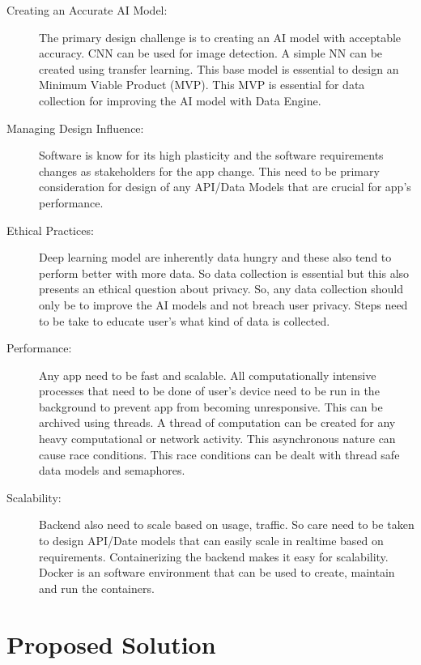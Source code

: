 \documentclass[../Report.tex]{subfiles}
\begin{document}
\begin{description}
    \item[Creating an Accurate AI Model:] The primary design challenge is to creating an AI model with acceptable accuracy. CNN
    can be used for image detection. A simple NN can be created using transfer learning. This base model is essential to design an 
    Minimum Viable Product (MVP). This MVP is essential for data collection for improving the AI model with Data Engine.
    
    \item[Managing Design Influence:] Software is know for its high plasticity and the software requirements changes as stakeholders for
    the app change. This need to be primary consideration for design of any API/Data Models that are crucial for app's performance.

    \item[Ethical Practices:] Deep learning model are inherently data hungry and these also tend to perform better with more data. So
    data collection is essential but this also presents an ethical question about privacy. So, any data collection should only be to 
    improve the AI models and not breach user privacy. Steps need to be take to educate user's what kind of data is collected.

    \item[Performance:] Any app need to be fast and scalable. All computationally intensive processes that need to be 
    done of user's device need to be run in the background to prevent app from becoming unresponsive. This can be archived using 
    threads. A thread of computation can be created for any heavy computational or network activity. This asynchronous nature can 
    cause race conditions. This race conditions can be dealt with thread safe data models and semaphores.
    
    \item[Scalability:] Backend also need to scale based on usage, traffic. So care need to be taken to design API/Date models that 
    can easily scale in realtime based on requirements. Containerizing the backend makes it easy for scalability. Docker is an software 
    environment that can be used to create, maintain and run the containers.
\end{description}

\section{Proposed Solution}
\end{document}
